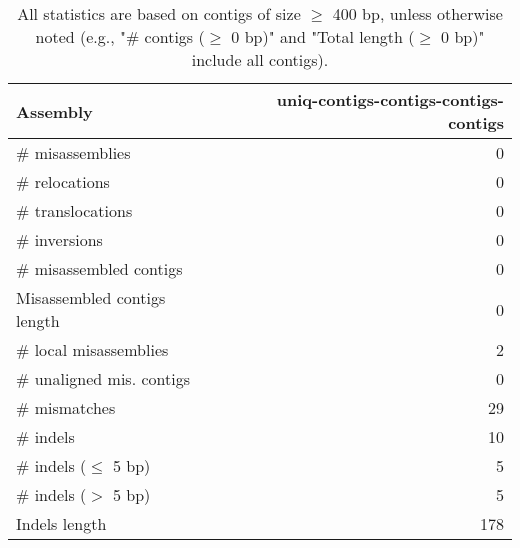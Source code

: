\documentclass[12pt,a4paper]{article}
\begin{document}
\begin{table}[ht]
\begin{center}
\caption{All statistics are based on contigs of size $\geq$ 400 bp, unless otherwise noted (e.g., "\# contigs ($\geq$ 0 bp)" and "Total length ($\geq$ 0 bp)" include all contigs).}
\begin{tabular}{|l*{1}{|r}|}
\hline
Assembly & uniq-contigs-contigs-contigs-contigs \\ \hline
\# misassemblies & 0 \\ \hline
\hspace{5mm}\# relocations & 0 \\ \hline
\hspace{5mm}\# translocations & 0 \\ \hline
\hspace{5mm}\# inversions & 0 \\ \hline
\# misassembled contigs & 0 \\ \hline
Misassembled contigs length & 0 \\ \hline
\# local misassemblies & 2 \\ \hline
\# unaligned mis. contigs & 0 \\ \hline
\# mismatches & 29 \\ \hline
\# indels & 10 \\ \hline
\hspace{5mm}\# indels ($\leq$ 5 bp) & 5 \\ \hline
\hspace{5mm}\# indels ($>$ 5 bp) & 5 \\ \hline
Indels length & 178 \\ \hline
\end{tabular}
\end{center}
\end{table}
\end{document}
